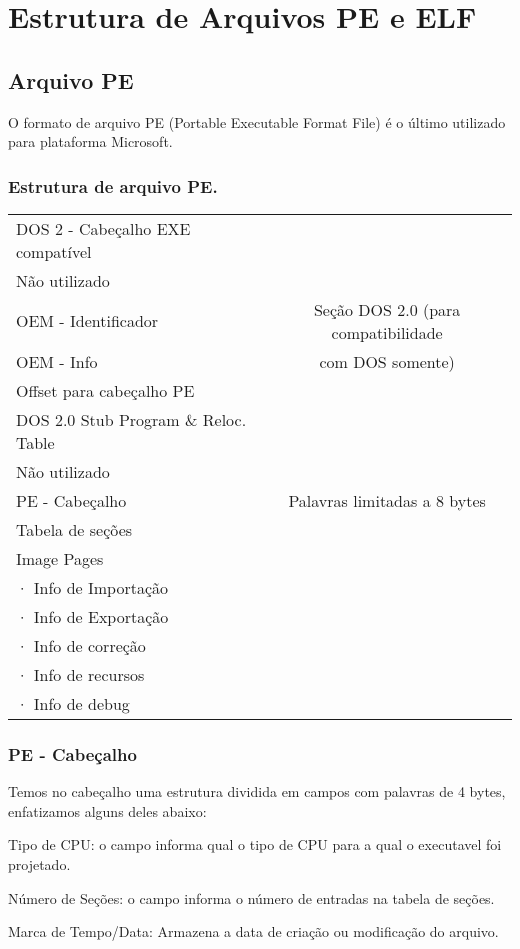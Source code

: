\chapter{Estrutura de Arquivos PE e ELF}

\section{Arquivo PE}

O formato de arquivo PE (Portable Executable Format File) é o último
utilizado para plataforma Microsoft.


\subsection{Estrutura de arquivo PE.}
\begin{list}{}
\item {\begin{tabular}{|l|c|}
\hline 
DOS 2 - Cabeçalho EXE compatível  & \tabularnewline
\cline{1-1} 
Não utilizado  & \tabularnewline
\cline{1-1} 
OEM - Identificador  & Seção DOS 2.0 (para compatibilidade \tabularnewline
OEM - Info  & com DOS somente)\tabularnewline
Offset para cabeçalho PE & \tabularnewline
\cline{1-1} 
DOS 2.0 Stub Program \& Reloc. Table  & \tabularnewline
\hline 
Não utilizado & \tabularnewline
\hline 
PE - Cabeçalho & Palavras limitadas a 8 bytes\tabularnewline
\hline 
Tabela de seções & \tabularnewline
\hline
Image Pages  & \tabularnewline
· Info de Importação & \tabularnewline
· Info de Exportação  & \tabularnewline
· Info de correção & \tabularnewline
· Info de recursos & \tabularnewline
· Info de debug & \tabularnewline
\hline
\end{tabular}}
\end{list}

\subsection{PE - Cabeçalho}


Temos no cabeçalho uma estrutura dividida em campos com palavras
de 4 bytes, enfatizamos alguns deles abaixo:


Tipo de CPU: o campo informa qual o tipo de CPU para a qual o executavel
foi projetado.


Número de Seções: o campo informa o número de entradas na tabela
de seções.


Marca de Tempo/Data: Armazena a data de criação ou modificação do
arquivo.


